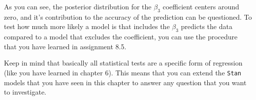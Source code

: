 
\clearpage %



As you can see, the posterior distribution for the $\beta_3$ coefficient centers around zero, and it's contribution to the accuracy of the prediction can be questioned. To test how much more likely a model is that includes the $\beta_3$ predicts the data compared to a model that excludes the coefficient, you can use the procedure that you have learned in assignment 8.5. \\




\fourlineanswerbox

Keep in mind that basically all statistical tests are a specific form of regression (like you have learned in chapter 6). This means that you can extend the \texttt{Stan} models that you have seen in this chapter to answer any question that you want to investigate.

\clearpage %